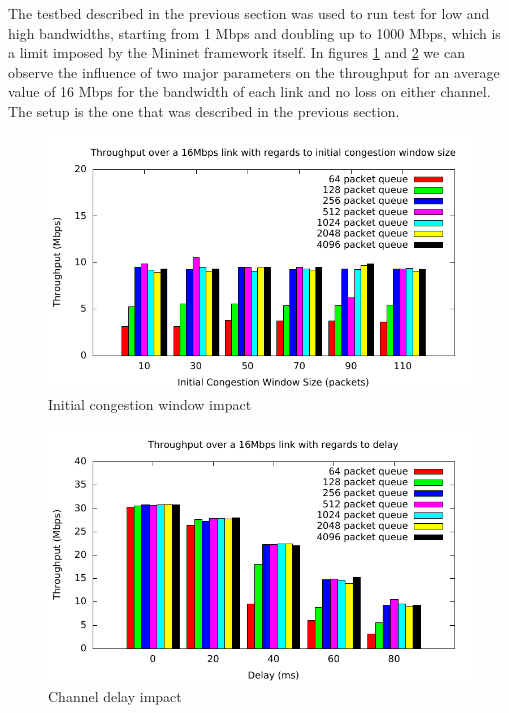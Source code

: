 
The testbed described in the previous section was used to run test
for low and high bandwidths, starting from 1 Mbps and doubling
up to 1000 Mbps, which is a limit imposed by the Mininet framework itself.
In figures \ref{fig:16mbps-cw} and \ref{fig:16mbps-d}  we can
observe the influence of two major parameters on the throughput for an average
value of 16 Mbps for the bandwidth of each link and no loss on either channel.
The setup is the one that was described in the previous section.

\begin{figure}
  \centering
  \includegraphics[width=\textwidth]{img/throughput-cwnd-16Mbps}
  \caption{Initial congestion window impact}
  \label{fig:16mbps-cw}
\end{figure}

\begin{figure}
  \centering
  \includegraphics[width=\textwidth]{img/throughput-delay-16Mbps}
  \caption{Channel delay impact}
  \label{fig:16mbps-d}
\end{figure}

